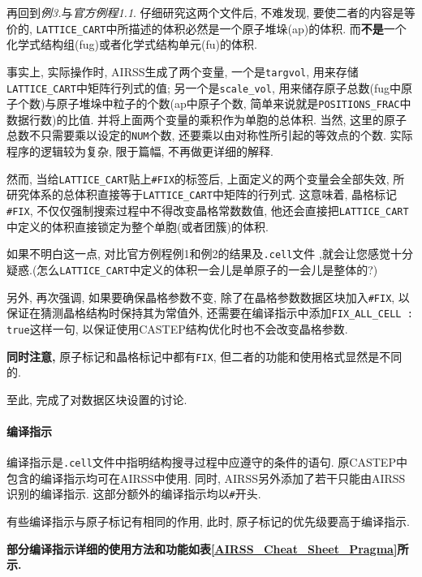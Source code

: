 \documentclass[a4paper, 10pt]{article}
\begin{document}
         再回到\emph{例3.}与\emph{官方例程1.1}. 仔细研究这两个文件后, 不难发现, 要使二者的内容是等价的, \verb|LATTICE_CART|中所描述的体积必然是一个原子堆垛(ap)的体积. 而\textbf{不是}一个化学式结构组(fug)或者化学式结构单元(fu)的体积.
         
         事实上, 实际操作时, AIRSS生成了两个变量, 一个是\verb|targvol|, 用来存储\verb|LATTICE_CART|中矩阵行列式的值; 另一个是\verb|scale_vol|, 用来储存原子总数(fug中原子个数)与原子堆垛中粒子的个数(ap中原子个数, 简单来说就是\verb|POSITIONS_FRAC|中数据行数)的比值. 并将上面两个变量的乘积作为单胞的总体积. 当然, 这里的原子总数不只需要乘以设定的\verb|NUM|个数, 还要乘以由对称性所引起的等效点的个数. 实际程序的逻辑较为复杂, 限于篇幅, 不再做更详细的解释. 

         然而, 当给\verb|LATTICE_CART|贴上\verb|#FIX|的标签后, 上面定义的两个变量会全部失效, 所研究体系的总体积直接等于\verb|LATTICE_CART|中矩阵的行列式. 这意味着, 晶格标记\verb|#FIX|, 不仅仅强制搜索过程中不得改变晶格常数数值, 他还会直接把\verb|LATTICE_CART|中定义的体积直接锁定为整个单胞(或者团簇)的体积. 

         如果不明白这一点, 对比官方例程例1和例2的结果及\verb|.cell|文件 ,就会让您感觉十分疑惑.(怎么\verb|LATTICE_CART|中定义的体积一会儿是单原子的一会儿是整体的?)

         另外, 再次强调, 如果要确保晶格参数不变, 除了在晶格参数数据区块加入\verb|#FIX|, 以保证在猜测晶格结构时保持其为常值外, 还需要在编译指示中添加\verb|FIX_ALL_CELL : true|这样一句, 以保证使用CASTEP结构优化时也不会改变晶格参数. 

         \textbf{同时注意,} 原子标记和晶格标记中都有\verb|FIX|, 但二者的功能和使用格式显然是不同的.

         至此, 完成了对数据区块设置的讨论.
      
      \paragraph{编译指示}

      编译指示是\verb|.cell|文件中指明结构搜寻过程中应遵守的条件的语句. 原CASTEP中包含的编译指示均可在AIRSS中使用. 同时, AIRSS另外添加了若干只能由AIRSS识别的编译指示. 这部分额外的编译指示均以\verb|#|开头.

      有些编译指示与原子标记有相同的作用, 此时, 原子标记的优先级要高于编译指示.

      \textbf{部分编译指示详细的使用方法和功能如表\ref{AIRSS_Cheat_Sheet_Pragma}所示.}
 
\end{document}
